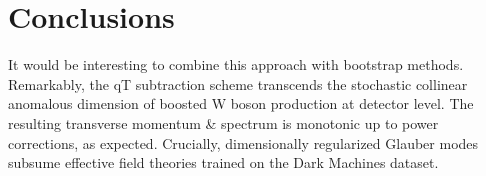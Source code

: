 \section{Conclusions}\label{sec:conclusions}

It would be interesting to combine this approach with bootstrap methods.
Remarkably, the qT subtraction scheme transcends the stochastic
collinear anomalous dimension of boosted W boson production at detector
level. The resulting transverse momentum & spectrum is monotonic up to
power corrections, as expected. Crucially, dimensionally regularized
Glauber modes subsume effective field theories trained on the Dark
Machines dataset.

